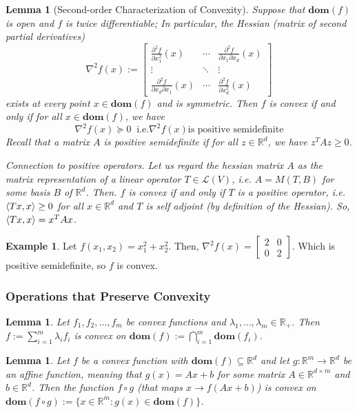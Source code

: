 \documentclass[10pt]{article}
\newcommand{\R}{\mathbb{R}}
\newcommand{\domain}[1]{\mathbf{dom}(#1)}
\newtheorem{lemma}[theorem]{Lemma}
\theoremstyle{remark}
\theoremstyle{definition}
\newtheorem{example}[theorem]{Example}
\begin{document}
\begin{lemma}[Second-order Characterization of Convexity]
	Suppose that $\domain{f}$ is open and $f$ is twice differentiable; 
	In particular, the Hessian (matrix of second partial derivatives)
	\[ \nabla^2 f(x) := \begin{bmatrix}
		\frac{\partial^2 f}{\partial x_1^2}(x) & \cdots & \frac{\partial^2 f}{\partial x_1 \partial x_d}(x)\\
		\vdots & \ddots & \vdots\\
		\frac{\partial^2 f}{\partial x_d \partial x_1}(x) & \cdots & \frac{\partial^2 f}{\partial x_d^2}(x)
	\end{bmatrix}
	\]
	exists at every point $x \in \domain{f}$ and is symmetric. Then $f$ is 
	convex if and only if for all $x \in \domain{f}$, we have 
	\begin{equation}
		\nabla^2 f(x) \succeq 0 \;\; \text{i.e.} \nabla^2 f(x) \text{is positive semidefinite}
	\end{equation}
	Recall that a matrix $A$ is positive semidefinite if for all $z \in \R^d$, we have
	$z^TAz \geq 0$. 

	Connection to positive operators. Let us regard the hessian matrix $A$ as the matrix representation of a linear operator 
	$T \in \mathcal{L}(V)$, i.e. $A= M(T,B)$ for some basis $B$ of $\R^d$. Then.
	$f$ is convex if and only if $T$ is a positive operator, i.e. $\left\langle Tx, x \right\rangle \geq 0$ for all $x \in \R^d$ and 
	$T$ is self adjoint (by definition of the Hessian). So, $\left\langle Tx, x \right\rangle = x^TAx$.
\end{lemma}

\begin{example}
	Let $f(x_1, x_2) = x_1^2 + x_2^2$. Then, $\nabla^2 f(x) = \begin{bmatrix}
		2 & 0\\
		0 & 2
	\end{bmatrix}$. Which is positive semidefinite, so $f$ is convex.
\end{example}

\subsubsection{Operations that Preserve Convexity}
\begin{lemma}
	Let $f_1, f_2, \ldots, f_m$ be convex functions and $\lambda_1, \ldots, \lambda_m \in \R_+$. Then 
	$ f := \sum_{i=1}^m\lambda_i f_i$ is convex on $\domain{f} := \bigcap_{i=1}^m \domain{f_i}$.
\end{lemma}
\begin{lemma}
	Let $f$ be a convex function with $\domain{f} \subseteq \R^d$ and let 
	$g: \R^m \to \R^d$ be an affine function, meaning that $g(x) = Ax+b$ for some 
	matrix $A \in \R^{d \times m}$ and $b \in \R^d$. Then the function $f \circ g$
	(that maps $x \to f(Ax+b)$) is convex on $\domain{f \circ g}:= \{x \in \R^m : g(x) \in \domain{f}\}$.
\end{lemma}
\end{document}

